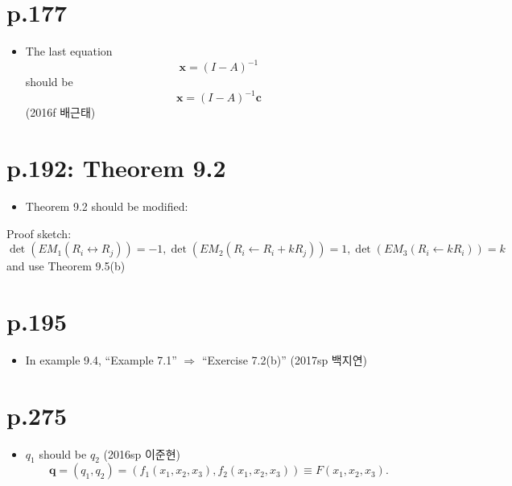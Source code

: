 \documentclass[a4paper]{article}
\begin{document}
\section{p.177} %
\label{sec:p_177}
\begin{itemize}
	\item The last equation
	\[
		\mathbf{x}=(I-A)^{-1}
	\]
	should be
	\[
		\mathbf{x}=(I-A)^{-1}\mathbf{c}
	\]
	(2016f 배근태)
\end{itemize}

\section{p.192: Theorem 9.2} %
\label{sec:p_192_theorem_9_2}
\begin{itemize}
	\item Theorem 9.2 should be modified:
	
\end{itemize}

Proof sketch:
$\det(EM_1(R_i\leftrightarrow R_j))=-1, \det(EM_2(R_i\leftarrow R_i + kR_j))=1, \det(EM_3(R_i\leftarrow k R_i))=k$ and use Theorem 9.5(b)


\section{p.195} %
\label{sec:p_195}
\begin{itemize}
	\item In example 9.4, ``Example 7.1'' $\Rightarrow$ ``Exercise 7.2(b)'' (2017sp 백지연)
\end{itemize}

\section{p.275} %
\label{sec:p_275}
\begin{itemize}
	\item $q_1$ should be $q_2$ (2016sp 이준현)
	\[
		\mathbf{q}=(q_1,q_2)=\left(f_1(x_1,x_2,x_3),f_2(x_1,x_2,x_3)\right)\equiv F(x_1,x_2,x_3).
	\]
\end{itemize}
\end{document}
